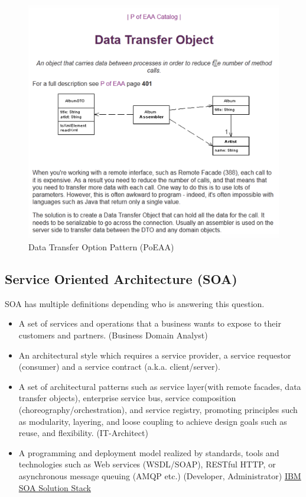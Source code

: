 \documentclass[../Main.tex]{subfiles}
\begin{document}
\begin{figure}[H]
    \centering
    \includegraphics[width=0.75\linewidth]{Images/data-transfer-object.png}
    \caption{Data Transfer Option Pattern (PoEAA)}
\end{figure}
\newpage

\subsection{Service Oriented Architecture (SOA)}
SOA has multiple definitions depending who is answering this question.
\begin{itemize}
    \item A set of services and operations that a business wants to expose to their customers and partners. (Business Domain Analyst)
    \item An architectural style which requires a service provider, a service 
    requestor (consumer) and a service contract (a.k.a. client/server).
    \item A set of architectural patterns such as service layer(with remote 
    facades, data transfer objects), enterprise service bus, service 
    composition (choreography/orchestration), and service registry, 
    promoting principles such as modularity, layering, and loose 
    coupling to achieve design goals such as reuse, and flexibility. (IT-Architect)
    \item A programming and deployment model realized by standards, 
    tools and technologies such as Web services (WSDL/SOAP), 
    RESTful HTTP, or asynchronous message queuing (AMQP etc.) (Developer, Administrator)
    \href{ibm.com}{IBM SOA Solution Stack}
\end{itemize}
\end{document}
